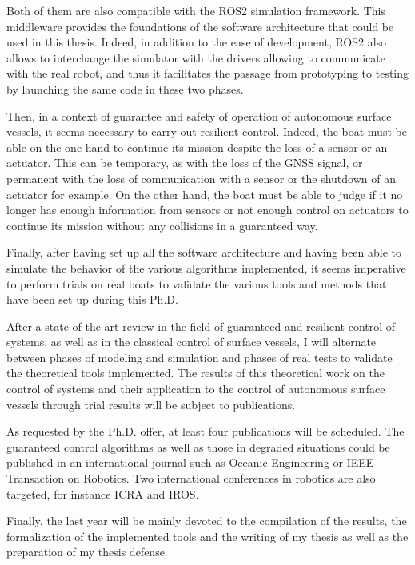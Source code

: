 \documentclass[11pt, a4paper]{awesome-cv}
\begin{document}
\begin{cvletter}
			Both of them are also compatible with the ROS2 simulation framework. This middleware provides the foundations of the software architecture that could be used in this thesis. Indeed, in addition to the ease of development, ROS2 also allows to interchange the simulator with the drivers allowing to communicate with the real robot, and thus it facilitates the passage from prototyping to testing by launching the same code in these two phases.
			
			Then, in a context of guarantee and safety of operation of autonomous surface vessels, it seems necessary to carry out resilient control. Indeed, the boat must be able on the one hand to continue its mission despite the loss of a sensor or an actuator. This can be temporary, as with the loss of the GNSS signal, or permanent with the loss of communication with a sensor or the shutdown of an actuator for example. On the other hand, the boat must be able to judge if it no longer has enough information from sensors or not enough control on actuators to continue its mission without any collisions in a guaranteed way.
		 
			Finally, after having set up all the software architecture and having been able to simulate the behavior of the various algorithms implemented, it seems imperative to perform trials on real boats to validate the various tools and methods that have been set up during this Ph.D.
		

			After a state of the art review in the field of guaranteed and resilient control of systems, as well as in the classical control of surface vessels, I will alternate between phases of modeling and simulation and phases of real tests to validate the theoretical tools implemented. The results of this theoretical work on the control of systems and their application to the control of autonomous surface vessels through trial results will be subject to publications.
			
			As requested by the Ph.D. offer, at least four publications will be scheduled. The guaranteed control algorithms as well as those in degraded situations could be published in an international journal such as Oceanic Engineering or IEEE Transaction on Robotics. Two international conferences in robotics are also targeted, for instance \textsc{ICRA} and \textsc{IROS}.

			Finally, the last year will be mainly devoted to the compilation of the results, the formalization of the implemented tools and the writing of my thesis as well as the preparation of my thesis defense.


\end{cvletter}
\end{document}
